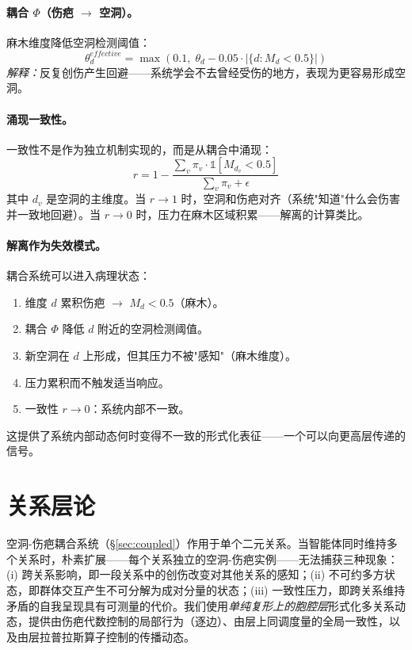 \documentclass[11pt]{article}
\begin{document}
\paragraph{耦合 $\Phi$（伤疤 $\to$ 空洞）。}
麻木维度降低空洞检测阈值：
\begin{equation}
\theta_d^{effective} = \max\left(0.1,\; \theta_d - 0.05 \cdot |\{d : M_d < 0.5\}|\right)
\end{equation}
\emph{解释：}反复创伤产生回避——系统学会不去曾经受伤的地方，表现为更容易形成空洞。

\paragraph{涌现一致性。}
一致性不是作为独立机制实现的，而是从耦合中涌现：
\begin{equation}
r = 1 - \frac{\sum_v \pi_v \cdot \mathbb{1}[M_{d_v} < 0.5]}{\sum_v \pi_v + \epsilon}
\label{eq:coherence}
\end{equation}
其中 $d_v$ 是空洞的主维度。当 $r \to 1$ 时，空洞和伤疤对齐（系统"知道"什么会伤害并一致地回避）。当 $r \to 0$ 时，压力在麻木区域积累——解离的计算类比。

\paragraph{解离作为失效模式。}
耦合系统可以进入病理状态：
\begin{enumerate}
\item 维度 $d$ 累积伤疤 $\to$ $M_d < 0.5$（麻木）。
\item 耦合 $\Phi$ 降低 $d$ 附近的空洞检测阈值。
\item 新空洞在 $d$ 上形成，但其压力不被"感知"（麻木维度）。
\item 压力累积而不触发适当响应。
\item 一致性 $r \to 0$：系统内部不一致。
\end{enumerate}
这提供了系统内部动态何时变得不一致的形式化表征——一个可以向更高层传递的信号。

\section{关系层论}
\label{sec:sheaf}

空洞-伤疤耦合系统（\S\ref{sec:coupled}）作用于单个二元关系。当智能体同时维持多个关系时，朴素扩展——每个关系独立的空洞-伤疤实例——无法捕获三种现象：(i) 跨关系影响，即一段关系中的创伤改变对其他关系的感知；(ii) 不可约多方状态，即群体交互产生不可分解为成对分量的状态；(iii) 一致性压力，即跨关系维持矛盾的自我呈现具有可测量的代价。我们使用\emph{单纯复形上的胞腔层}形式化多关系动态，提供由伤疤代数控制的局部行为（逐边）、由层上同调度量的全局一致性，以及由层拉普拉斯算子控制的传播动态。
\end{document}

